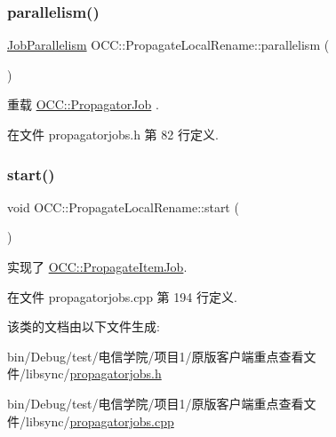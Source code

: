\subsubsection{\texorpdfstring{parallelism()}{parallelism()}}
{\footnotesize\ttfamily \hyperlink{class_o_c_c_1_1_propagator_job_a2527eb0e2b598fc260a2d6449689c156}{Job\+Parallelism} O\+C\+C\+::\+Propagate\+Local\+Rename\+::parallelism (\begin{DoxyParamCaption}{ }\end{DoxyParamCaption})\hspace{0.3cm}{\ttfamily [virtual]}}



重载 \hyperlink{class_o_c_c_1_1_propagator_job_a55105e001d55177f8ccf01acecc5e637}{O\+C\+C\+::\+Propagator\+Job} .



在文件 propagatorjobs.\+h 第 82 行定义.

\mbox{\label{class_o_c_c_1_1_propagate_local_rename_a9c4741f660f381d80ca02fa886b4aec2}} 
\subsubsection{\texorpdfstring{start()}{start()}}
{\footnotesize\ttfamily void O\+C\+C\+::\+Propagate\+Local\+Rename\+::start (\begin{DoxyParamCaption}{ }\end{DoxyParamCaption})\hspace{0.3cm}{\ttfamily [virtual]}}



实现了 \hyperlink{class_o_c_c_1_1_propagate_item_job_a97e7a37e51ad1696f6590dd52080f10a}{O\+C\+C\+::\+Propagate\+Item\+Job}.



在文件 propagatorjobs.\+cpp 第 194 行定义.



该类的文档由以下文件生成\+:\begin{DoxyCompactItemize}
\item 
bin/\+Debug/test/电信学院/项目1/原版客户端重点查看文件/libsync/\hyperlink{propagatorjobs_8h}{propagatorjobs.\+h}\item 
bin/\+Debug/test/电信学院/项目1/原版客户端重点查看文件/libsync/\hyperlink{propagatorjobs_8cpp}{propagatorjobs.\+cpp}\end{DoxyCompactItemize}
